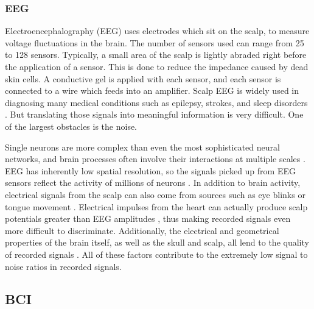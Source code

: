 \documentclass[12pt,titlepage]{article}
\begin{document}
\subsubsection{EEG}

Electroencephalography (EEG) uses electrodes which sit on the scalp, to measure voltage fluctuations 
in the brain.  The number of sensors used can range from 25 to 128 sensors.  Typically, a small area of 
the scalp is lightly abraded right before the application of a sensor.  This is done to reduce the 
impedance caused by dead skin cells.  A conductive gel is applied with each sensor, and each sensor is 
connected to a wire which feeds into an amplifier.  Scalp EEG is widely used in diagnosing many 
medical conditions such as epilepsy, strokes, and sleep disorders \cite{nunez_electric_2005}.  But translating those signals into meaningful information is very difficult.  One of the largest obstacles is the noise.

Single neurons are more complex than even the most sophisticated neural networks, and brain 
processes often involve their interactions at multiple scales \cite{nunez_electric_2005}.   EEG has inherently low spatial 
resolution, so the signals picked up from EEG  sensors reflect the activity of millions of neurons \cite{nunez_electric_2005}.  In 
addition to brain activity, electrical signals from the scalp can also come from sources such as eye 
blinks or tongue movement \cite{nunez_electric_2005}.  Electrical impulses from the heart can actually produce scalp potentials 
greater than EEG amplitudes \cite{nunez_electric_2005}, thus making recorded signals even more difficult to discriminate. 
Additionally, the electrical and geometrical properties of the brain itself, as well as the skull and scalp, 
all lend to the quality of recorded signals \cite{nunez_electric_2005}.  All of these factors contribute to the extremely low signal 
to noise ratios in recorded signals.


\subsection{BCI}
\end{document}
